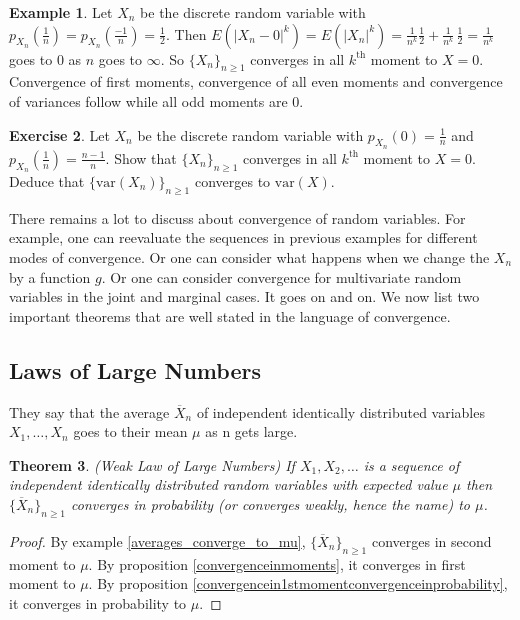 \documentclass[12pt]{amsart}
\newtheorem{theorem}{Theorem}[section]
\theoremstyle{definition}
\newtheorem{example}[theorem]{Example}
\newtheorem{exercise}[theorem]{Exercise}
\begin{document}
\begin{example} \label{convergence_in_kth_moment_1} Let $X_n$ be the discrete random variable with $p_{X_n}(\frac{1}{n}) = p_{X_n}(\frac{-1}{n}) = \frac{1}{2}$. Then $E(|X_n - 0|^k) = E(|X_n|^k) = \frac{1}{n^k}\frac{1}{2} + \frac{1}{n^k} \, \frac{1}{2} = \frac{1}{n^k}$ goes to 0 as $n$ goes to $\infty$. So $\{X_n\}_{n \geq 1}$ converges in all $k^{\text{th}}$ moment to $X = 0$. Convergence of first moments, convergence of all even moments and convergence of variances follow while all odd moments are 0.
\end{example}

\begin{exercise} \label{convergence_in_kth_moment_2} Let $X_n$ be the discrete random variable with $p_{X_n}(0) = \frac{1}{n}$ and $p_{X_n}(\frac{1}{n}) = \frac{n-1}{n}$. Show that $\{X_n\}_{n \geq 1}$ converges in all $k^{\text{th}}$ moment to $X = 0$. Deduce that $\{\text{var}(X_n)\}_{n \geq 1}$ converges to $\text{var}(X)$.
\end{exercise}

There remains a lot to discuss about convergence of random variables. For example, one can reevaluate the sequences in previous examples for different modes of convergence. Or one can consider what happens when we change the $X_n$ by a function $g$. Or one can consider convergence for multivariate random variables in the joint and marginal cases. It goes on and on. We now list two important theorems that are well stated in the language of convergence.

\subsection{Laws of Large Numbers} They say that the average $\overline{X}_n$ of independent identically distributed variables $X_1, \dots , X_n$ goes to their mean $\mu$ as n gets large.

\begin{theorem} (Weak Law of Large Numbers) If $X_1, X_2, \dots$ is a sequence of independent identically distributed random variables with expected value $\mu$ then $\{\overline{X}_n\}_{n \geq 1}$ converges in probability (or converges weakly, hence the name) to $\mu$.
\end{theorem}
\begin{proof} By example \ref{averages_converge_to_mu}, $\{\overline{X}_n\}_{n \geq 1}$ converges in second moment to $\mu$. By proposition \ref{convergenceinmoments}, it converges in first moment to $\mu$. By proposition \ref{convergencein1stmomentconvergenceinprobability}, it converges in probability to $\mu$.
\end{proof}
\end{document}
